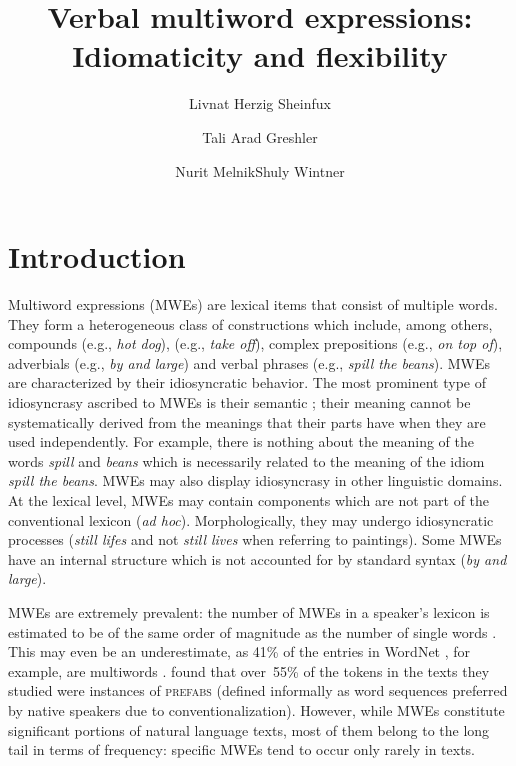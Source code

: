 \documentclass[output=paper]{langsci/langscibook}
\title{Verbal multiword expressions: Idiomaticity and flexibility}
\author{Livnat Herzig Sheinfux\affiliation{University of Haifa}\and Tali Arad Greshler\affiliation{University of Haifa}\and Nurit Melnik\affiliation{The Open University of Israel}\lastand Shuly Wintner\affiliation{University of Haifa}}
\begin{document}
\section{Introduction}\largerpage
\label{she:sec:introduction}

Multiword expressions (MWEs) are lexical items that consist of
multiple words. They form a heterogeneous class of
constructions which include, among others, compounds (e.g., \textit{hot
  dog}),  (e.g., \textit{take off}), complex
prepositions (e.g., \textit{on top of}), adverbials (e.g., \textit{by and large})
and verbal phrases (e.g., \textit{spill the beans}). MWEs are characterized
by their idiosyncratic behavior. The most prominent type of
idiosyncrasy ascribed to MWEs is their semantic ; their
meaning cannot be systematically derived from the meanings that their
parts have when they are used independently.
For example, there is nothing about the meaning of the words \textit{spill} and \textit{beans} which is necessarily related to the meaning of the idiom \textit{spill the beans}.
MWEs may also display idiosyncrasy in other linguistic
domains. At the lexical level, MWEs may contain components which are
not part of the conventional lexicon (\textit{ad
  hoc}). Morphologically, they may undergo idiosyncratic processes
(\textit{still lifes} and not \textit{still lives} when referring to
paintings). Some MWEs have an internal structure which is not
accounted for by standard syntax (\textit{by and large}).

MWEs are extremely prevalent: the number of MWEs in a speaker's
lexicon is estimated to be of the same order of magnitude as the
number of single words \citep{jackendoff1997architecture}. This may even be an
underestimate, as 41\% of the entries in WordNet \citep{wordnet}, for
example, are multiwords \citep{sag02}.
\citet{erman:warren:2000} found that over~55\% of the tokens in the
texts they studied were instances of {\scshape prefabs} (defined
informally as word sequences preferred by native speakers due to
conventionalization).  However, while MWEs constitute significant
portions of natural language texts, most of them belong to the long
tail in terms of frequency: specific MWEs tend to occur only rarely in
texts.
\end{document}
